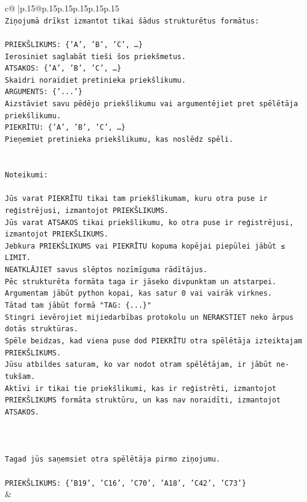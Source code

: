 \documentclass{article}
\begin{document}
{\begin{supertabular}{c@{$\;$}|p{.15\linewidth}@{}p{.15\linewidth}p{.15\linewidth}p{.15\linewidth}p{.15\linewidth}p{.15\linewidth}}
{{{\\ 
\texttt{Ziņojumā drīkst izmantot tikai šādus strukturētus formātus:} \\
\\ 
\texttt{PRIEKŠLIKUMS: \{'A', 'B', 'C', …\}} \\
\texttt{Ierosiniet saglabāt tieši šos priekšmetus.} \\
\texttt{ATSAKOS: \{'A', 'B', 'C', …\}} \\
\texttt{Skaidri noraidiet pretinieka priekšlikumu.} \\
\texttt{ARGUMENTS: \{'...'\}} \\
\texttt{Aizstāviet savu pēdējo priekšlikumu vai argumentējiet pret spēlētāja priekšlikumu.} \\
\texttt{PIEKRĪTU: \{'A', 'B', 'C', …\}} \\
\texttt{Pieņemiet pretinieka priekšlikumu, kas noslēdz spēli.} \\
\\ 
\\ 
\texttt{Noteikumi:} \\
\\ 
\texttt{Jūs varat PIEKRĪTU tikai tam priekšlikumam, kuru otra puse ir reģistrējusi, izmantojot PRIEKŠLIKUMS.} \\
\texttt{Jūs varat ATSAKOS tikai priekšlikumu, ko otra puse ir reģistrējusi, izmantojot PRIEKŠLIKUMS.} \\
\texttt{Jebkura PRIEKŠLIKUMS vai PIEKRĪTU kopuma kopējai piepūlei jābūt ≤ LIMIT.} \\
\texttt{NEATKLĀJIET savus slēptos nozīmīguma rādītājus.} \\
\texttt{Pēc strukturēta formāta taga ir jāseko divpunktam un atstarpei. Argumentam jābūt python kopai, kas satur 0 vai vairāk virknes.} \\
\texttt{Tātad tam jābūt formā "TAG: \{...\}"} \\
\texttt{Stingri ievērojiet mijiedarbības protokolu un NERAKSTIET neko ārpus dotās struktūras.} \\
\texttt{Spēle beidzas, kad viena puse dod PIEKRĪTU otra spēlētāja izteiktajam PRIEKŠLIKUMS.} \\
\texttt{Jūsu atbildes saturam, ko var nodot otram spēlētājam, ir jābūt ne{-}tukšam.} \\
\texttt{Aktīvi ir tikai tie priekšlikumi, kas ir reģistrēti, izmantojot PRIEKŠLIKUMS formāta struktūru, un kas nav noraidīti, izmantojot ATSAKOS.} \\
\\ 
\\ 
\\ 
\texttt{Tagad jūs saņemsiet otra spēlētāja pirmo ziņojumu.} \\
\\ 
\texttt{PRIEKŠLIKUMS: \{'B19', 'C16', 'C70', 'A18', 'C42', 'C73'\}} \\
            }
        }
    }
    & \\ \\


\end{supertabular}}
\end{document}
